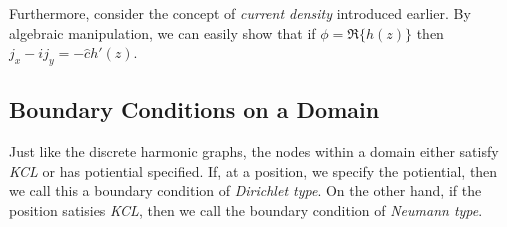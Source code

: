 \documentclass[]{article}
\begin{document}
Furthermore, consider the concept of \emph{current density} introduced
earlier. By algebraic manipulation, we can easily show that if
\(\phi = \Re \{h(z)\}\) then \(j_x - i j_y = -\hat{c}h'(z)\).

\subsection{Boundary Conditions on a
Domain}\label{boundary-conditions-on-a-domain}

Just like the discrete harmonic graphs, the nodes within a domain either
satisfy \emph{KCL} or has potiential specified. If, at a position, we
specify the potiential, then we call this a boundary condition of
\emph{Dirichlet type}. On the other hand, if the position satisies
\emph{KCL}, then we call the boundary condition of \emph{Neumann type}.
\end{document}
